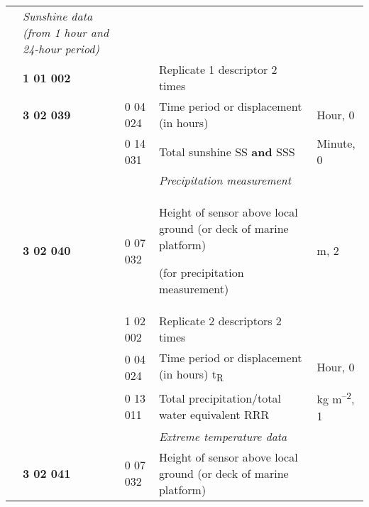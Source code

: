 \begin{longtable}[]{@{}lllll@{}}
\begin{minipage}[t]{0.17\columnwidth}
{\subsection{}\label{section-3}}\strut
\end{minipage} & \begin{minipage}[t]{0.17\columnwidth}\raggedright
\emph{Sunshine data (from 1 hour and 24-hour period)}\strut
\end{minipage} & \begin{minipage}[t]{0.17\columnwidth}\raggedright
\strut
\end{minipage}\tabularnewline
& \textbf{1 01 002} & & Replicate 1 descriptor 2 times &\tabularnewline
& \textbf{3 02 039} & 0 04 024 & Time period or displacement (in hours) & Hour, 0\tabularnewline
& & 0 14 031 & Total sunshine SS \textbf{and} SSS & Minute, 0\tabularnewline
& & & \emph{Precipitation measurement} &\tabularnewline
\begin{minipage}[t]{0.17\columnwidth}\raggedright
\strut
\end{minipage} & \begin{minipage}[t]{0.17\columnwidth}\raggedright
\textbf{3 02 040}\strut
\end{minipage} & \begin{minipage}[t]{0.17\columnwidth}\raggedright
0 07 032\strut
\end{minipage} & \begin{minipage}[t]{0.17\columnwidth}\raggedright
Height of sensor above local ground (or deck of marine platform)

(for precipitation measurement)\strut
\end{minipage} & \begin{minipage}[t]{0.17\columnwidth}\raggedright
m, 2\strut
\end{minipage}\tabularnewline
& & 1 02 002 & Replicate 2 descriptors 2 times &\tabularnewline
& & 0 04 024 & Time period or displacement (in hours) t\textsubscript{R} & Hour, 0\tabularnewline
& & 0 13 011 & Total precipitation/total water equivalent RRR & kg m\textsuperscript{--2}, 1\tabularnewline
& & & \emph{Extreme temperature data} &\tabularnewline
\begin{minipage}[t]{0.17\columnwidth}\raggedright
\strut
\end{minipage} & \begin{minipage}[t]{0.17\columnwidth}\raggedright
\textbf{3 02 041}\strut
\end{minipage} & \begin{minipage}[t]{0.17\columnwidth}\raggedright
0 07 032\strut
\end{minipage} & \begin{minipage}[t]{0.17\columnwidth}\raggedright
Height of sensor above local ground (or deck of marine platform)


\end{minipage}
\end{longtable}
